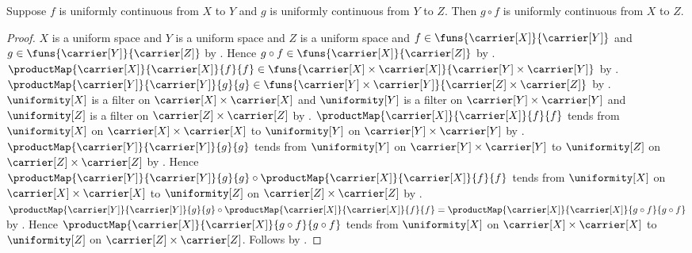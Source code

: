\begin{theorem}\label{uniformly_continuous_composition}
    Suppose $f$ is uniformly continuous from $X$ to $Y$ and
        $g$ is uniformly continuous from $Y$ to $Z$.
    Then $g\circ f$ is uniformly continuous from $X$ to $Z$.
\end{theorem}
\begin{proof}
    $X$ is a uniform space and $Y$ is a uniform space and
        $Z$ is a uniform space and
        $f\in\funs{\carrier[X]}{\carrier[Y]}$ and
        $g\in\funs{\carrier[Y]}{\carrier[Z]}$ by
        .
    Hence $g\circ f\in\funs{\carrier[X]}{\carrier[Z]}$ by
        .
    $\productMap{\carrier[X]}{\carrier[X]}{f}{f}\in\funs{
        \carrier[X]\times\carrier[X]}{
        \carrier[Y]\times\carrier[Y]}$ by .
    $\productMap{\carrier[Y]}{\carrier[Y]}{g}{g}\in\funs{
        \carrier[Y]\times\carrier[Y]}{
        \carrier[Z]\times\carrier[Z]}$ by .
    $\uniformity[X]$ is a filter on
        $\carrier[X]\times\carrier[X]$ and
        $\uniformity[Y]$ is a filter on
        $\carrier[Y]\times\carrier[Y]$ and
        $\uniformity[Z]$ is a filter on
        $\carrier[Z]\times\carrier[Z]$ by .
    $\productMap{\carrier[X]}{\carrier[X]}{f}{f}$ tends from
        $\uniformity[X]$ on
        $\carrier[X]\times\carrier[X]$ to
        $\uniformity[Y]$ on
        $\carrier[Y]\times\carrier[Y]$ by
        .
    $\productMap{\carrier[Y]}{\carrier[Y]}{g}{g}$ tends from
        $\uniformity[Y]$ on
        $\carrier[Y]\times\carrier[Y]$ to
        $\uniformity[Z]$ on
        $\carrier[Z]\times\carrier[Z]$ by
        .
    Hence $\productMap{\carrier[Y]}{\carrier[Y]}{g}{g}\circ
        \productMap{\carrier[X]}{\carrier[X]}{f}{f}$ tends from
        $\uniformity[X]$ on
        $\carrier[X]\times\carrier[X]$ to
        $\uniformity[Z]$ on
        $\carrier[Z]\times\carrier[Z]$ by
        .
    $\productMap{\carrier[Y]}{\carrier[Y]}{g}{g}\circ
        \productMap{\carrier[X]}{\carrier[X]}{f}{f}=
        \productMap{\carrier[X]}{\carrier[X]}{g\circ f}{g\circ f}$
        by .
    Hence $\productMap{\carrier[X]}{\carrier[X]}{g\circ f}{g\circ f}$
        tends from $\uniformity[X]$ on
        $\carrier[X]\times\carrier[X]$ to
        $\uniformity[Z]$ on
        $\carrier[Z]\times\carrier[Z]$.
    Follows by .
\end{proof}
